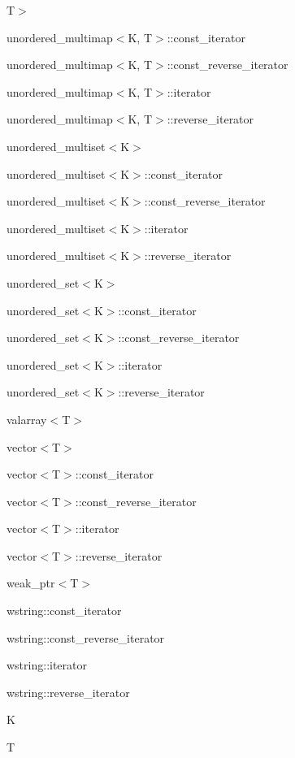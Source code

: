 \begin{DoxyCompactList}
T$>$\item unordered\+\_\+multimap$<$K, T$>$\+:\+:const\+\_\+iterator\item unordered\+\_\+multimap$<$K, T$>$\+:\+:const\+\_\+reverse\+\_\+iterator\item unordered\+\_\+multimap$<$K, T$>$\+:\+:iterator\item unordered\+\_\+multimap$<$K, T$>$\+:\+:reverse\+\_\+iterator\item unordered\+\_\+multiset$<$K$>$\item unordered\+\_\+multiset$<$K$>$\+:\+:const\+\_\+iterator\item unordered\+\_\+multiset$<$K$>$\+:\+:const\+\_\+reverse\+\_\+iterator\item unordered\+\_\+multiset$<$K$>$\+:\+:iterator\item unordered\+\_\+multiset$<$K$>$\+:\+:reverse\+\_\+iterator\item unordered\+\_\+set$<$K$>$\item unordered\+\_\+set$<$K$>$\+:\+:const\+\_\+iterator\item unordered\+\_\+set$<$K$>$\+:\+:const\+\_\+reverse\+\_\+iterator\item unordered\+\_\+set$<$K$>$\+:\+:iterator\item unordered\+\_\+set$<$K$>$\+:\+:reverse\+\_\+iterator\item valarray$<$T$>$\item vector$<$T$>$\item vector$<$T$>$\+:\+:const\+\_\+iterator\item vector$<$T$>$\+:\+:const\+\_\+reverse\+\_\+iterator\item vector$<$T$>$\+:\+:iterator\item vector$<$T$>$\+:\+:reverse\+\_\+iterator\item weak\+\_\+ptr$<$T$>$\item wstring\+:\+:const\+\_\+iterator\item wstring\+:\+:const\+\_\+reverse\+\_\+iterator\item wstring\+:\+:iterator\item wstring\+:\+:reverse\+\_\+iterator\item K\item T\end{DoxyCompactList}
